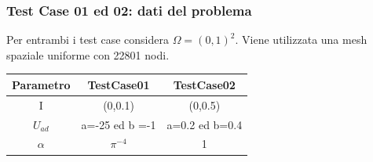 \documentclass{beamer}
\theoremstyle{definition}
\theoremstyle{remark}
\theoremstyle{plain}
\theoremstyle{definition}
\begin{document}
\begin{frame}
\frametitle{Test Case 01 ed 02: dati del problema}

Per entrambi i test case considera $\Omega = (0,1)^2$.
Viene utilizzata una mesh spaziale uniforme con 22801 nodi.

\begin{table}
\centering
\begin{tabular}{|c|c|c|}
\hline
\textbf{Parametro} & \textbf{TestCase01} & \textbf{TestCase02} \\
\hline
I & (0,0.1) & (0,0.5) \\
\hline
$U_{ad}$ & a=-25 ed b =-1 & a=0.2 ed b=0.4 \\
\hline
$\alpha$ & $\pi^{-4}$ & 1 \\
\hline
\end{tabular}
\end{table}

\end{frame}
\end{document}
